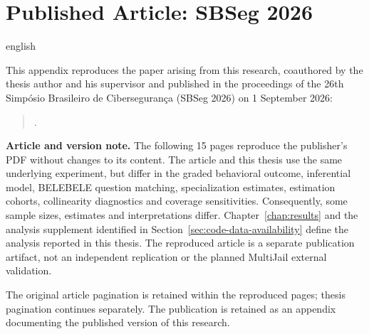 \chapter{Published Article: SBSeg 2026}
\label{app:published-sbseg-2026}

\begin{otherlanguage*}{english}

This appendix reproduces the paper arising from this research, coauthored by the thesis author and his supervisor and published in the proceedings of the 26th Simpósio Brasileiro de Cibersegurança (SBSeg 2026) on 1 September 2026:

\begin{quote}
.
\end{quote}

\noindent\textbf{Article and version note.}
The following 15 pages reproduce the publisher's PDF without changes to its content. The article and this thesis use the same underlying experiment, but differ in the graded behavioral outcome, inferential model, BELEBELE question matching, specialization estimates, estimation cohorts, collinearity diagnostics and coverage sensitivities. Consequently, some sample sizes, estimates and interpretations differ. Chapter~\ref{chap:results} and the analysis supplement identified in Section~\ref{sec:code-data-availability} define the analysis reported in this thesis. The reproduced article is a separate publication artifact, not an independent replication or the planned MultiJail external validation.

The original article pagination is retained within the reproduced pages; thesis pagination continues separately. The publication is retained as an appendix documenting the published version of this research.

\end{otherlanguage*}

